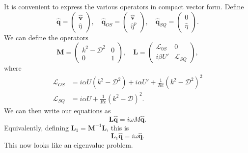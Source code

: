 \documentclass[a4paper]{article}
\begin{document}
It is convenient to express the various operators in compact vector form. Define
\[
  \hat{\mathbf{q}} =
  \begin{pmatrix}
    \hat{\mathbf{v}}\\\hat{\eta}
  \end{pmatrix},\quad
  \hat{\mathbf{q}}_{OS} =
  \begin{pmatrix}
    \hat{\mathbf{v}}\\ \hat{\eta}^p
  \end{pmatrix},\quad 
  \hat{\mathbf{q}}_{SQ} =
  \begin{pmatrix}
    0 \\ \hat{\eta}
  \end{pmatrix}.
\]
We can define the operators
\[
  \mathbf{M} = 
  \begin{pmatrix}
    k^2 - \mathcal{D}^2 & 0\\
    0 & 1
  \end{pmatrix},\quad
  \mathbf{L} =
  \begin{pmatrix}
    \mathcal{L}_{0S} & 0\\
    i \beta U' & \mathcal{L}_{SQ}
  \end{pmatrix},
\]
where
\begin{align*}
  \mathcal{L}_{OS} &= i\alpha U(k^2 - \mathcal{D}^2) + i \alpha U' + \frac{1}{Re} (k^2 - \mathcal{D}^2)^2\\
  \mathcal{L}_{SQ} &= i\alpha U + \frac{1}{Re}(k^2 - \mathcal{D})^2.
\end{align*}
We can then write our equations as
\[
  \mathbf{L}\hat{\mathbf{q}} = i \omega M \hat{\mathbf{q}}.
\]
Equivalently, defining $\mathbf{L}_1 = \mathbf{M}^{-1} \mathbf{L}$, this is
\[
  \mathbf{L}_1 \hat{\mathbf{q}} = i \omega \hat{\mathbf{q}}.
\]
This now looks like an eigenvalue problem.
\end{document}
